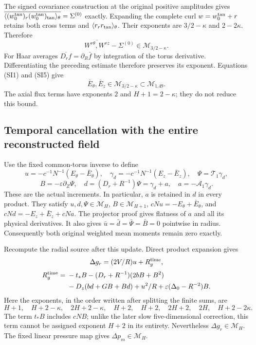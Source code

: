 \documentclass[10pt,a4paper]{article}
\begin{document}
The signed covariance construction at the original positive amplitudes gives
$\overline{\langle(w_0^{\rm tan})_r(w_0^{\rm tan})_{\rm tan}
\rangle_\theta}=\Sigma^{(0)}$ exactly.  Expanding the complete curl
$w=w_0^{\rm tan}+r$ retains both cross terms and $\langle r_rr_{\rm tan}
\rangle_\theta$.  Their exponents are $3/2-\kappa$ and $2-2\kappa$.
Therefore
\[
\overline{W^{r\theta},W^{rz}}-\Sigma^{(0)}
 \in\mathcal M_{3/2-\kappa}.
\]
For Haar averages $\overline{D_rf}=\partial_R\bar f$ by integration of
the torus derivative.  Differentiating the preceding estimate therefore
preserves its exponent.  Equations (SI1) and (SI5) give
\[
\bar E_\theta,\bar E_z\in\mathcal M_{3/2-\kappa}
 \subset\mathcal M_{1.49}.
\tag{SI6}
\]
The axial flux terms have exponents $2$ and $H+1=2-\kappa$;
they do not reduce this bound.

\subsection{Temporal cancellation with the entire reconstructed field}

Use the fixed common-torus inverse to define
\[
u=-c^{-1}N^{-1}(E_\theta-\bar E_\theta),\quad
\gamma_d=-c^{-1}N^{-1}(E_z-\bar E_z),\quad
\Psi=\mathcal T_1\gamma_d,
\]
\[
B=-\varepsilon\partial_Z\Psi,\quad
d=(D_r+R^{-1})\Psi=\gamma_d+a,\quad a=-\mathcal A_1\gamma_d.
\tag{SI7}
\]
These are the actual increments.  In particular, $a$ is retained in $d$ in
every product.  They satisfy
$u,d,\Psi\in\mathcal M_H$, $B\in\mathcal M_{H+1}$,
$cNu=-E_\theta+\bar E_\theta$, and
$cNd=-E_z+\bar E_z+cNa$.
The projector proof gives flatness of $a$ and all its physical derivatives.
It also gives $\bar u=\bar d=\bar\Psi=\bar B=0$ pointwise in radius.
Consequently both original weighted mean moments remain zero exactly.

Recompute the radial source after this update.  Direct product expansion
gives
\[
\Delta g_r=(2V/R)u+R_g^{\rm time},
\]
\begin{align*}
R_g^{\rm time}={}&-t_*B-(D_r+R^{-1})(2bB+B^2)\\
&-D_z(bd+GB+Bd)+u^2/R
 +\varepsilon(\Delta_0-R^{-2})B.
\end{align*}
Here the exponents, in the order written after splitting the finite sums,
are
\[
H+1,\quad H+2-\kappa,\quad2H+2-\kappa,\quad
H+2,\quad H+2,\quad2H+2,\quad2H,\quad H+2-2\kappa.
\]
The term $t_*B$ includes $cNB$; unlike the later slow five-dimensional
correction, this term cannot be assigned exponent $H+2$ in its entirety.
Nevertheless $\Delta g_r\in\mathcal M_H$.  The fixed linear pressure
map gives $\Delta p_m\in\mathcal M_H$.
\end{document}
